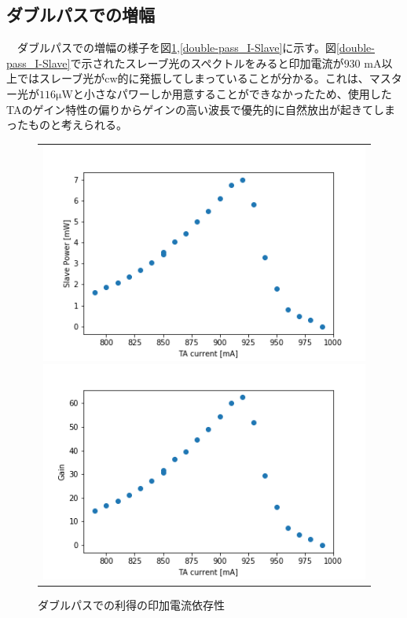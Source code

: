 \documentclass[uplatex, dvipdfmx, a4paper, report, papersize, 11pt]{jsbook}
\begin{document}
\subsection{ダブルパスでの増幅}
　ダブルパスでの増幅の様子を図\ref{double-pass_I-Gain},\ref{double-pass_I-Slave}に示す。図\ref{double-pass_I-Slave}で示されたスレーブ光のスペクトルをみると印加電流が$930$ mA以上ではスレーブ光がcw的に発振してしまっていることが分かる。これは、マスター光が$116 \mathrm{\mu W}$と小さなパワーしか用意することができなかったため、使用したTAのゲイン特性の偏りからゲインの高い波長で優先的に自然放出が起きてしまったものと考えられる。

\newpage
\begin{figure}[htpb]
  \centering
    \begin{tabular}{c}
      \begin{minipage}{0.50\hsize}
        \centering
          \includegraphics[keepaspectratio,  scale=0.5,  angle=0]
                          {figures/chapter4/double-pass_I-slavepower.png}
                          \caption{ダブルパスでのスレーブ光強度の印加電流依存性}
                          \label{double-pass_I-slavepower}
      \end{minipage}
      \begin{minipage}{0.50\hsize}
        \centering
          \includegraphics[keepaspectratio,  scale=0.5,  angle=0]
                          {figures/chapter4/double-pass_I-Gain.png}
                          \caption{ダブルパスでの利得の印加電流依存性}
                          \label{double-pass_I-Gain}
      \end{minipage}\\


\end{tabular}
\end{figure}
\end{document}
